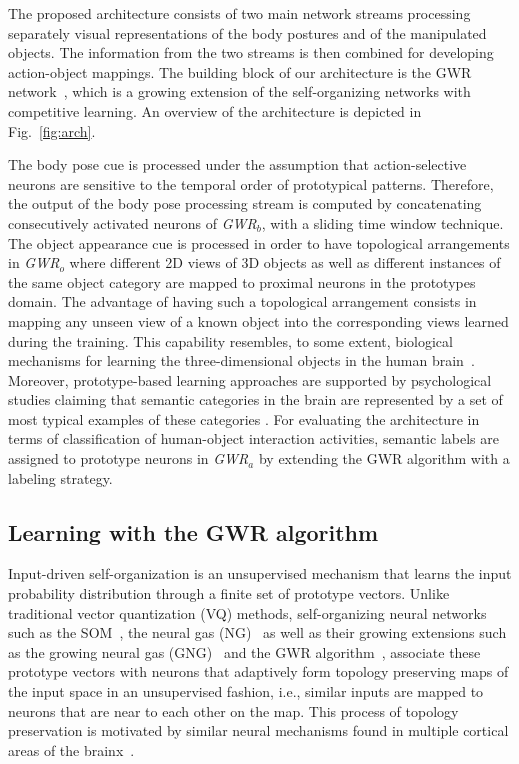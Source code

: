\documentclass[5p,times]{elsarticle}
\begin{document}
The proposed architecture consists of two main network streams processing separately visual representations of the body postures and of the manipulated objects. 
The information from the two streams is then combined for developing action-object mappings.
The building block of our architecture is the GWR network~\citep{marsland2002self}, which is a growing extension of the self-organizing networks with competitive learning.
An overview of the architecture is depicted in Fig.~\ref{fig:arch}.

The body pose cue is processed under the assumption that action-selective neurons are sensitive to the temporal order of prototypical patterns.
Therefore, the output of the body pose processing stream is computed by concatenating consecutively activated neurons of \textit{GWR}$_b$, with a sliding time window technique.
The object appearance cue is processed in order to have topological arrangements in \textit{GWR}$_o$ where different 2D views of 3D objects as well as different instances of the same object category are mapped to proximal neurons in the prototypes domain. 
The advantage of having such a topological arrangement consists in mapping any unseen view of a known object into the corresponding views learned during the training. 
This capability resembles, to some extent, biological mechanisms for learning the three-dimensional objects in the human brain~\citep{poggio1990network, perrett1996view, grill2013representation}.
Moreover, prototype-based learning approaches are supported by psychological studies claiming that semantic categories in the brain are represented by a set of most typical examples of these categories \citep{rosch1975family}.
For evaluating the architecture in terms of classification of human-object interaction activities, semantic labels are assigned to prototype neurons in \textit{GWR}$_a$ by extending the GWR algorithm with a labeling strategy.

\subsection{Learning with the GWR algorithm}\label{subsec:gwr}

Input-driven self-organization is an unsupervised mechanism that learns the input probability distribution through a finite set of prototype vectors.
Unlike traditional vector quantization (VQ) methods, self-organizing neural networks such as the SOM~\citep{Kohonen201352}, the neural gas (NG)~\citep{martinetz1991neural} as well as their growing extensions such as the growing neural gas (GNG)~\cite{fritzke1995growing} and the GWR algorithm~\cite{marsland2002self}, associate these prototype vectors with neurons that adaptively form topology preserving maps of the input space in an unsupervised fashion, i.e., similar inputs are mapped to neurons that are near to each other on the map.
This process of topology preservation is motivated by similar neural mechanisms found in multiple cortical areas of the brainx~\cite{miikkulainen2006computational}.
\end{document}
